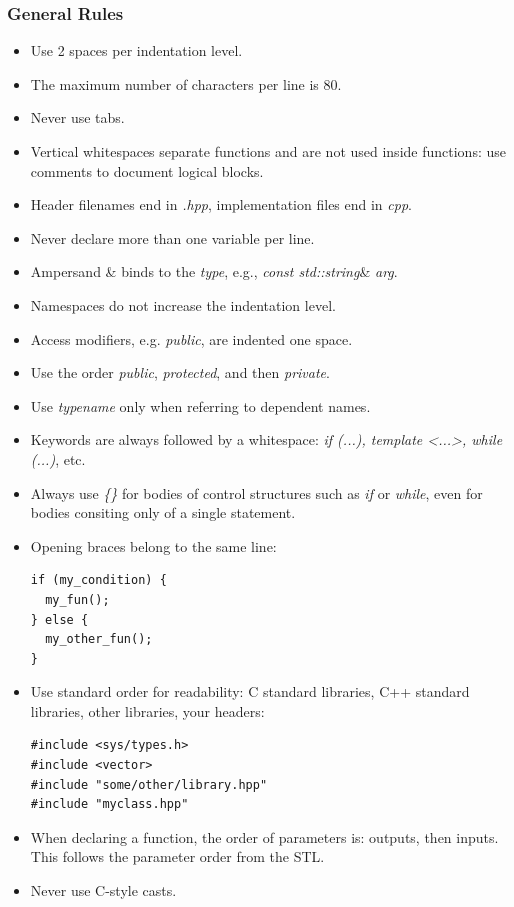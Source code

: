 \documentclass[oneside,a4paper,titlepage]{scrartcl} %
\begin{document}
\subsubsection{General Rules}
\begin{itemize}
 \item Use 2 spaces per indentation level.
 \item The maximum number of characters per line is 80.
 \item Never use tabs.
 \item Vertical whitespaces separate functions and are not used inside functions: use comments to document logical blocks.
 \item Header filenames end in \emph{.hpp}, implementation files end in \emph{cpp}.
 \item Never declare more than one variable per line.
 \item Ampersand {\&} binds to the \emph{type}, e.g., \emph{const std::string}\& \emph{arg}.
 \item Namespaces do not increase the indentation level.
 \item Access modifiers, e.g. \emph{public}, are indented one space.
 \item Use the order \emph{public}, \emph{protected}, and then \emph{private}.
 \item Use \emph{typename} only when referring to dependent names.
 \item Keywords are always followed by a whitespace: \emph{if (...), template \textless...\textgreater, while (...)}, etc.
 \item Always use \emph{\{\}} for bodies of control structures such as \emph{if} or \emph{while}, even for bodies consiting only of a single statement.
 \item Opening braces belong to the same line:
 \begin{lstlisting}
if (my_condition) {
  my_fun();
} else {
  my_other_fun();
}
 \end{lstlisting}
 \item Use standard order for readability: C standard libraries, C++ standard libraries, other libraries, your headers:
 \begin{lstlisting}
#include <sys/types.h>
#include <vector>
#include "some/other/library.hpp"
#include "myclass.hpp"
 \end{lstlisting}
 \item When declaring a function, the order of parameters is: outputs, then inputs. This follows the parameter order from the STL.
 \item Never use C-style casts.
\end{itemize}
\end{document}
